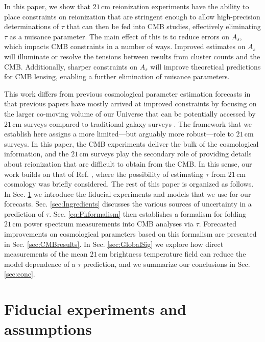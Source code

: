 \documentclass[twocolumn,aps,prd,nofootinbib,showpacs]{revtex4-1}
\begin{document}
In this paper, we show that $21\,\textrm{cm}$ reionization experiments have the ability to place constraints on reionization that are stringent enough to allow high-precision determinations of $\tau$ that can then be fed into CMB studies, effectively eliminating $\tau$ as a nuisance parameter. The main effect of this is to reduce errors on $A_s$, which impacts CMB constraints in a number of ways. Improved estimates on $A_s$ will illuminate or resolve the tensions between results from cluster counts and the CMB. Additionally, sharper constraints on $A_s$ will improve theoretical predictions for CMB lensing, enabling a further elimination of nuisance parameters.

This work differs from previous cosmological parameter estimation forecasts in that previous papers have mostly arrived at improved constraints by focusing on the larger co-moving volume of our Universe that can be potentially accessed by $21\,\textrm{cm}$ surveys compared to traditional galaxy surveys \cite{mcquinn_et_al2006,bowman_et_al2007,mao_et_al2008,loeb_and_wyithe2008,tegmark_and_zaldarriaga2009,barger_et_al2009,visbal_et_al2009,clesse_et_al2012,oyama_et_al2013,bull_et_al2015}. The framework that we establish here assigns a more limited---but arguably more robust---role to $21\,\textrm{cm}$ surveys. In this paper, the CMB experiments deliver the bulk of the cosmological information, and the $21\,\textrm{cm}$ surveys play the secondary role of providing details about reionization that are difficult to obtain from the CMB. In this sense, our work builds on that of Ref. \cite{pritchard_et_al2010}, where the possibility of estimating $\tau$ from $21\,\textrm{cm}$ cosmology was briefly considered. The rest of this paper is organized as follows. In Sec. \ref{sec:fidExpt} we introduce the fiducial experiments and models that we use for our forecasts. Sec. \ref{sec:Ingredients} discusses the various sources of uncertainty in a prediction of $\tau$. Sec. \ref{eq:Pkformalism} then establishes a formalism for folding $21\,\textrm{cm}$ power spectrum measurements into CMB analyses via $\tau$. Forecasted improvements on cosmological parameters based on this formalism are presented in Sec. \ref{sec:CMBresults}. In Sec. \ref{sec:GlobalSig} we explore how direct measurements of the mean $21\,\textrm{cm}$ brightness temperature field can reduce the model dependence of a $\tau$ prediction, and we summarize our conclusions in Sec. \ref{sec:conc}.

\section{Fiducial experiments and assumptions}
\label{sec:fidExpt}
\end{document}
